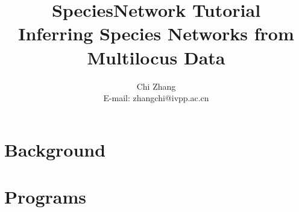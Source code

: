 \documentclass[11pt]{article}
\begin{document}
\title{SpeciesNetwork Tutorial \\
\large Inferring Species Networks from Multilocus Data}
\author{Chi Zhang \\
E-mail: zhangchi@ivpp.ac.cn}
\maketitle

\newpage
\section*{Background}

\section*{Programs}





\end{document}

